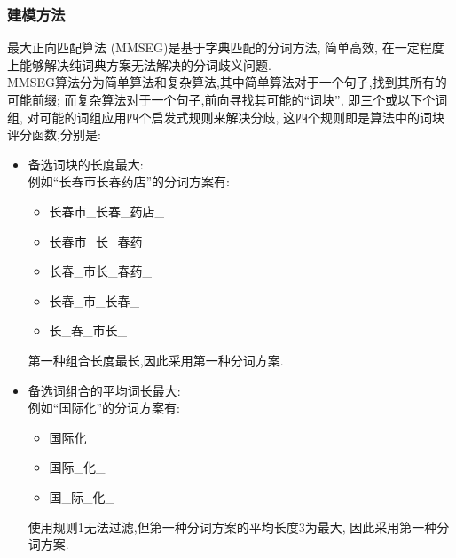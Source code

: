 \documentclass[titlepage]{article}
\begin{document}
\subsubsection{建模方法}
最大正向匹配算法 (MMSEG)是基于字典匹配的分词方法, 简单高效, 在一定程度上能够解决纯词典方案无法解决的分词歧义问题.\\

\noindent MMSEG算法分为简单算法和复杂算法,其中简单算法对于一个句子,找到其所有的可能前缀; 而复杂算法对于一个句子,前向寻找其可能的``词块'', 即三个或以下个词组, 对可能的词组应用四个启发式规则来解决分歧, 这四个规则即是算法中的词块评分函数,分别是:

\begin{itemize}
\item  备选词块的长度最大:\\[1em]
    例如``长春市长春药店''的分词方案有:
    \begin{itemize}[label=\tiny$\bullet$]
        \item 长春市\_长春\_药店\_
        \item 长春市\_长\_春药\_
        \item 长春\_市长\_春药\_
        \item 长春\_市\_长春\_
        \item 长\_春\_市长\_
    \end{itemize}
    第一种组合长度最长,因此采用第一种分词方案.
\item 备选词组合的平均词长最大:\\[1em]
    例如``国际化''的分词方案有:
    \begin{itemize}
        \item 国际化\_
        \item 国际\_化\_
        \item 国\_际\_化\_
    \end{itemize}
    使用规则1无法过滤,但第一种分词方案的平均长度3为最大, 因此采用第一种分词方案.


\end{itemize}
\end{document}
